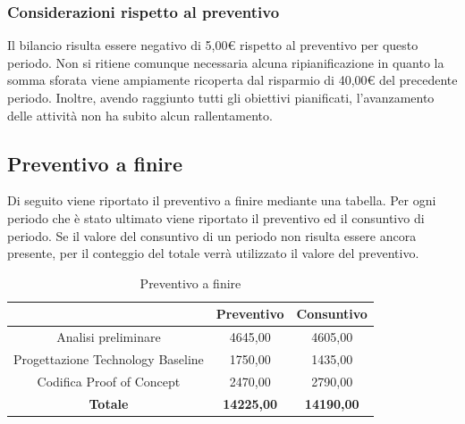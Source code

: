 \subsubsection{Considerazioni rispetto al preventivo} \label{subsubsection:considerazioni_finali_PoC}
Il bilancio risulta essere negativo di 5,00€ rispetto al preventivo per questo periodo.
Non si ritiene comunque necessaria alcuna ripianificazione in quanto la somma sforata viene ampiamente ricoperta dal risparmio di 40,00€ del precedente periodo.
Inoltre, avendo raggiunto tutti gli obiettivi pianificati, l'avanzamento delle attività non ha subito alcun rallentamento.




\pagebreak
\subsection{Preventivo a finire} \label{subsection:preventivo_a_finire}
Di seguito viene riportato il preventivo a finire mediante una tabella.
Per ogni periodo che è stato ultimato viene riportato il preventivo ed il consuntivo di periodo.
Se il valore del consuntivo di un periodo non risulta essere ancora presente, per il conteggio del totale verrà utilizzato il valore del preventivo.
\begin{table}[H]
  \centering
  \renewcommand{\arraystretch}{1.8}
  \begin{tabular}{c|c|c}
    \rowcolor[HTML]{125E28}
    \multicolumn{1}{c}{\color[HTML]{FFFFFF}\textbf{Periodo}}
                                      & \multicolumn{1}{c}{\color[HTML]{FFFFFF}\textbf{Preventivo}}
                                      & \multicolumn{1}{c}{\color[HTML]{FFFFFF}\textbf{Consuntivo}}                     \\
    \hline
    Analisi preliminare               & 4645,00                                                     & 4605,00           \\
    Progettazione Technology Baseline & 1750,00                                                     & 1435,00           \\
    Codifica Proof of Concept         & 2470,00                                                     & 2790,00           \\
    \textbf{Totale}                   & \textbf{14225,00}                                           & \textbf{14190,00} \\
  \end{tabular}
  \caption{Preventivo a finire}
\end{table}



